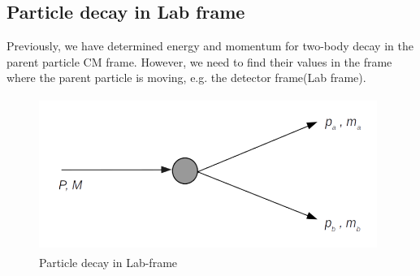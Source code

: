 \subsection{Particle decay in Lab frame}
Previously, we have determined energy and momentum  for two-body decay in the parent particle CM frame. However, we need to find their values in the frame where the parent particle is moving, e.g. the detector frame(Lab frame).  
\begin{figure}[h]
    \centering
    \includegraphics[width=11cm, height=5cm]{lab3.png}
    \caption{Particle decay in Lab-frame}
    \label{fig:my_label}
\end{figure}
\\
\noindent
